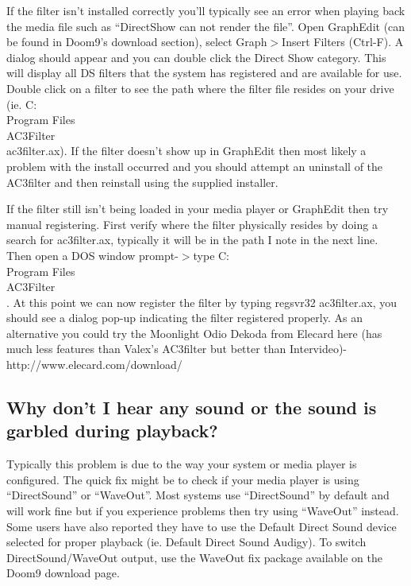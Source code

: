 ﻿\documentclass[12pt]{article}
\begin{document}
If the filter isn't installed correctly you'll typically see an error when playing back the media
file such as ``DirectShow can not render the file''. Open GraphEdit (can be found in Doom9's
download section), select Graph$>$Insert Filters (Ctrl-F). A dialog should appear and you can double
click the Direct Show category. This will display all DS filters that the system has registered and
are available for use. Double click on a filter to see the path where the filter file resides on
your drive (ie. C:\\Program Files\\AC3Filter\\ac3filter.ax). If the filter doesn't show up in GraphEdit
then most likely a problem with the install occurred and you should attempt an uninstall of the
AC3filter and then reinstall using the supplied installer.

If the filter still isn't being loaded in your media player or GraphEdit then try manual
registering. First verify where the filter physically resides by doing a search for ac3filter.ax,
typically it will be in the path I note in the next line. Then open a DOS window prompt-$>$type
C:\\Program Files\\AC3Filter\\. At this point we can now register the filter by typing regsvr32
ac3filter.ax, you should see a dialog pop-up indicating the filter registered properly. As an
alternative you could try the Moonlight Odio Dekoda from Elecard here (has much less features than
Valex's AC3filter but better than Intervideo)- http://www.elecard.com/download/

\subsection{Why don't I hear any sound or the sound is garbled during playback?}

Typically this problem is due to the way your system or media player is configured. The quick fix
might be to check if your media player is using ``DirectSound'' or ``WaveOut''. Most systems use
``DirectSound'' by default and will work fine but if you experience problems then try using
``WaveOut'' instead. Some users have also reported they have to use the Default Direct Sound device
selected for proper playback (ie. Default Direct Sound Audigy). To switch DirectSound/WaveOut
output, use the WaveOut fix package available on the Doom9 download page.
\end{document}
